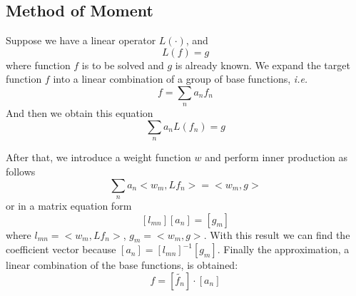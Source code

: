 \subsection{Method of Moment}

Suppose we have a linear operator $L(\cdot)$, and
$$ L(f) = g $$
where function $f$ is to be solved and $g$ is already known.
We expand the target function $f$ into a linear combination of
a group of base functions, {\it i.e.}
$$ f = \sum_n a_n f_n $$
And then we obtain this equation
$$ \sum_n a_n L(f_n) = g $$

After that, we introduce a weight function $w$ and perform
inner production as follows
$$ \sum_n a_n < w_m, Lf_n > = < w_m, g > $$
or in a matrix equation form
$$ [l_{mn}] [a_n] = [g_m] $$
where $l_{mn} = < w_m, Lf_n >$, $g_m = < w_m, g >$.
With this result we can find the coefficient vector because
$ [a_n] = [l_{mn}]^{-1} [g_m] $.
Finally the approximation, a linear combination of the base
functions, is obtained:
$$ f = [ \tilde{f_n} ] \cdot [a_n] $$
